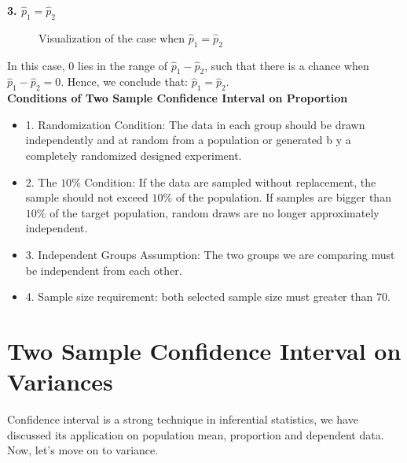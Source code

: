 \textbf{3. $\hat{p}_1 = \hat{p}_2$}

\begin{center}
\begin{figure}[h!]
\centering
{}
\caption{Visualization of the case when $\hat{p}_1 = \hat{p}_2$}
\end{figure}
\end{center}

In this case, $0$ lies in the range of $\hat{p}_1 - \hat{p}_2$, such that there is a chance when $\hat{p}_1 - \hat{p}_2 = 0$. Hence, we conclude that: $\hat{p}_1 = \hat{p}_2$.\\

\textbf{Conditions of Two Sample Confidence Interval on Proportion}

\begin{itemize}
	\item 1. Randomization Condition: The data in each group should be drawn independently and at random from a population or generated b y a completely randomized designed experiment.
	\item 2. The $10\%$ Condition: If the data are sampled without replacement, the sample should not exceed $10\%$ of the population. If samples are bigger than $10\%$ of the target population, random draws are no longer approximately independent.
	\item 3. Independent Groups Assumption: The two groups we are comparing must be independent from each other.
	\item 4. Sample size requirement: both selected sample size must greater than $70$.
\end{itemize}

\section{Two Sample Confidence Interval on Variances}

Confidence interval is a strong technique in inferential statistics, we have discussed its application on population mean, proportion and dependent data. Now, let's move on to variance.\\

